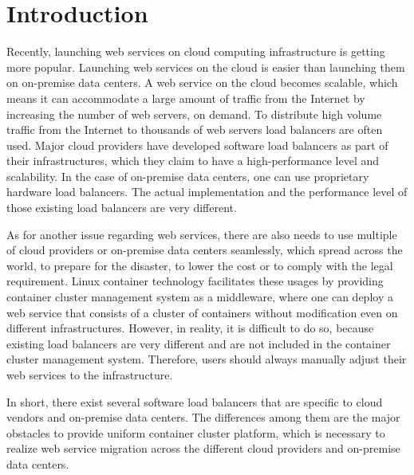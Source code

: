 \section{Introduction}

Recently, launching web services on cloud computing infrastructure is getting more popular.
Launching web services on the cloud is easier than launching them on on-premise data centers.
A web service on the cloud becomes scalable, which means it can accommodate a large amount of traffic from the Internet by increasing the number of web servers, on demand.
To distribute high volume traffic from the Internet to thousands of web servers load balancers are often used.
Major cloud providers have developed software load balancers\cite{eisenbud2016maglev,patel2013ananta} as part of their infrastructures, which they claim to have a high-performance level and scalability.
In the case of on-premise data centers, one can use proprietary hardware load balancers.
The actual implementation and the performance level of those existing load balancers are very different.

As for another issue regarding web services,
there are also needs to use multiple of cloud providers or on-premise data centers seamlessly, which spread across the world, to prepare for the disaster, to lower the cost or to comply with the legal requirement.
Linux container technology\cite{menage2007adding} facilitates these usages by providing container cluster management system as a middleware,
where one can deploy a web service that consists of a cluster of containers without modification even on different infrastructures.
However, in reality, it is difficult to do so, because existing load balancers are very different and are not included in the container cluster management system.
Therefore, users should always manually adjust their web services to the infrastructure.

In short, there exist several software load balancers that are specific to cloud vendors and on-premise data centers.
The differences among them are the major obstacles to provide uniform container cluster platform, which is necessary to realize web service migration across the different cloud providers and on-premise data centers.

